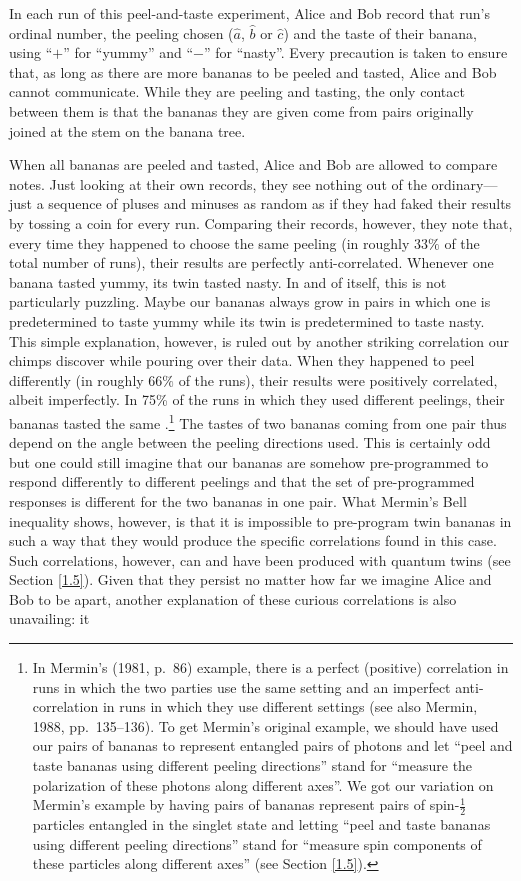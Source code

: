 In each run of this peel-and-taste experiment, Alice and Bob record that run's ordinal number, the peeling chosen ($\hat{a}$, $\hat{b}$ or $\hat{c}$) and the taste of their banana, using ``$+$'' for ``yummy'' and ``$-$'' for ``nasty''. Every precaution is taken to ensure that, as long as there are more bananas to be peeled and tasted, Alice and Bob cannot communicate. While they are peeling and tasting, the only contact between them is that the bananas they are given come from pairs originally joined at the stem on the banana tree.

When all bananas are peeled and tasted, Alice and Bob are allowed to compare notes. Just looking at their own records, they see nothing out of the ordinary---just a sequence of pluses and minuses as random as if they had faked their results by tossing a coin for every run. Comparing their records, however, they note that, every time they happened to choose the same peeling (in roughly $33 \%$ of the total number of runs), their results are perfectly anti-correlated. Whenever one banana tasted yummy, its twin tasted nasty. In and of itself, this is not particularly puzzling. Maybe our bananas always grow in pairs in which one is predetermined to taste yummy while its twin is predetermined to taste nasty. This simple explanation, however, is ruled out by another striking correlation our chimps discover while pouring over their data. When they happened to peel differently (in roughly $66 \%$ of the runs), their results were positively correlated, albeit imperfectly. In 75\% of the runs in which they used different peelings, their bananas tasted the same \citep[p.\ 86]{Mermin 1981}.\footnote{In Mermin's (1981, p.\ 86) example, there is a perfect (positive) correlation in runs in which the two parties use the same setting and an imperfect anti-correlation in runs in which they use different settings (see also Mermin, 1988, pp.\ 135--136). To get Mermin's original example, we should have used our pairs of bananas to represent entangled pairs of photons and let ``peel and taste bananas using different peeling directions'' stand for ``measure the polarization of these photons along different axes''. We got our variation on Mermin's example by having pairs of bananas represent pairs of spin-$\frac12$ particles entangled in the singlet state and letting ``peel and taste bananas using different peeling directions''  stand for ``measure spin components of these particles along different axes'' (see Section \ref{1.5}).\label{mermin}} The tastes of two bananas coming from one pair thus depend on the angle between the peeling directions used. This is certainly odd but one could still imagine that our bananas are somehow pre-programmed to respond differently to different peelings and that the set of pre-programmed responses is different for the two bananas in one pair. What Mermin's Bell inequality shows, however, is that it is impossible to pre-program twin bananas in such a way that they would produce the specific correlations found in this case. Such correlations, however, can and have been produced with quantum twins (see Section \ref{1.5}). Given that they persist no matter how far we imagine Alice and Bob to be apart, another explanation of these curious correlations is also unavailing: it 